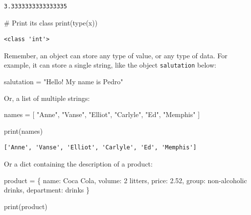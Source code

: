 \documentclass[
  11pt,
  letterpaper,
  DIV=11,
  numbers=noendperiod]{scrreprt}
\newenvironment{Shaded}{\begin{snugshade}}{\end{snugshade}}
\newcommand{\BuiltInTok}[1]{\textcolor[rgb]{0.00,0.23,0.31}{#1}}
\newcommand{\CommentTok}[1]{\textcolor[rgb]{0.37,0.37,0.37}{#1}}
\newcommand{\FloatTok}[1]{\textcolor[rgb]{0.68,0.00,0.00}{#1}}
\newcommand{\NormalTok}[1]{\textcolor[rgb]{0.00,0.23,0.31}{#1}}
\newcommand{\OperatorTok}[1]{\textcolor[rgb]{0.37,0.37,0.37}{#1}}
\newcommand{\StringTok}[1]{\textcolor[rgb]{0.13,0.47,0.30}{#1}}
\begin{document}
\begin{verbatim}
3.3333333333333335
\end{verbatim}

\begin{Shaded}
\begin{Highlighting}[]
\CommentTok{\# Print its class}
\BuiltInTok{print}\NormalTok{(}\BuiltInTok{type}\NormalTok{(x))}
\end{Highlighting}
\end{Shaded}

\begin{verbatim}
<class 'int'>
\end{verbatim}

Remember, an object can store any type of value, or any type of data.
For example, it can store a single string, like the object
\texttt{salutation} below:

\begin{Shaded}
\begin{Highlighting}[]
\NormalTok{salutation }\OperatorTok{=} \StringTok{"Hello! My name is Pedro"}
\end{Highlighting}
\end{Shaded}

Or, a list of multiple strings:

\begin{Shaded}
\begin{Highlighting}[]
\NormalTok{names }\OperatorTok{=}\NormalTok{ [}
  \StringTok{"Anne"}\NormalTok{, }\StringTok{"Vanse"}\NormalTok{, }\StringTok{"Elliot"}\NormalTok{,}
  \StringTok{"Carlyle"}\NormalTok{, }\StringTok{"Ed"}\NormalTok{, }\StringTok{"Memphis"}
\NormalTok{]}

\BuiltInTok{print}\NormalTok{(names)}
\end{Highlighting}
\end{Shaded}

\begin{verbatim}
['Anne', 'Vanse', 'Elliot', 'Carlyle', 'Ed', 'Memphis']
\end{verbatim}

Or a dict containing the description of a product:

\begin{Shaded}
\begin{Highlighting}[]
\NormalTok{product }\OperatorTok{=}\NormalTok{ \{}
  \StringTok{\textquotesingle{}name\textquotesingle{}}\NormalTok{: }\StringTok{\textquotesingle{}Coca Cola\textquotesingle{}}\NormalTok{,}
  \StringTok{\textquotesingle{}volume\textquotesingle{}}\NormalTok{: }\StringTok{\textquotesingle{}2 litters\textquotesingle{}}\NormalTok{,}
  \StringTok{\textquotesingle{}price\textquotesingle{}}\NormalTok{: }\FloatTok{2.52}\NormalTok{,}
  \StringTok{\textquotesingle{}group\textquotesingle{}}\NormalTok{: }\StringTok{\textquotesingle{}non{-}alcoholic drinks\textquotesingle{}}\NormalTok{,}
  \StringTok{\textquotesingle{}department\textquotesingle{}}\NormalTok{: }\StringTok{\textquotesingle{}drinks\textquotesingle{}}
\NormalTok{\}}

\BuiltInTok{print}\NormalTok{(product)}
\end{Highlighting}
\end{Shaded}
\end{document}
